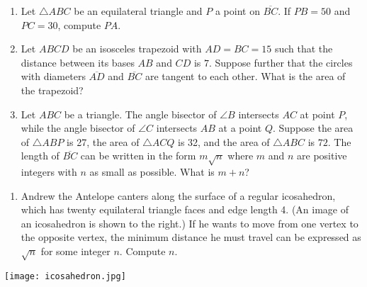 \documentclass[10pt]{article}
\newcounter{enum}
\begin{document}
\begin{enumerate}
\setlength{\itemsep}{5pt}

\item Let $\triangle ABC$ be an equilateral triangle and $P$ a point on $\overline{BC}$.  If $PB=50$ and $PC=30$, compute $PA$. %

\item Let $ABCD$ be an isosceles trapezoid with $AD=BC=15$ such that the distance between its bases $AB$ and $CD$ is $7$.  Suppose further that the circles with diameters $\overline{AD}$ and $\overline{BC}$ are tangent to each other.  What is the area of the trapezoid? %

\item Let $ABC$ be a triangle.  The angle bisector of $\angle B$ intersects $AC$ at point $P$, while the angle bisector of $\angle C$ intersects $AB$ at a point $Q$.  Suppose the area of $\triangle ABP$ is 27, the area of $\triangle ACQ$ is 32, and the area of $\triangle ABC$ is $72$.  The length of $\overline{BC}$ can be written in the form $m\sqrt n$ where $m$ and $n$ are positive integers with $n$ as small as possible.  What is $m+n$?

\setcounter{enum}{\theenumi}
\end{enumerate}

\hspace*{-\parindent}%
\begin{minipage}{0.85\textwidth}
\begin{enumerate}
\setcounter{enumi}{\theenum}
\item Andrew the Antelope canters along the surface of a regular icosahedron, which has twenty equilateral triangle faces and edge length 4. (An image of an icosahedron is shown to the right.) If he wants to move from one vertex to the opposite vertex, the minimum distance he must travel can be expressed as $\sqrt{n}$ for some integer $n$.  Compute $n$. %
\setcounter{enum}{\theenumi}
\end{enumerate}

\end{minipage} \hfill
\begin{minipage}{0.12\textwidth}

\texttt{[image: icosahedron.jpg]}
\end{minipage}
\end{document}
